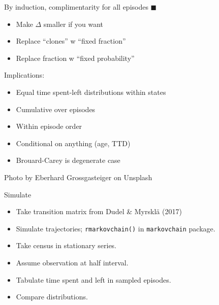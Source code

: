 \documentclass[20pt,usenames,dvipsnames]{beamer}
\newcommand*{\QEDA}{\hfill\ensuremath{\blacksquare}}
\begin{document}
\begin{frame}[plain]
\Large
\begin{center}
By induction, complimentarity for all episodes \QEDA
\end{center}
\pause
\begin{itemize}[<+->]
  \item Make $\Delta$ smaller if you want
  \item Replace ``clones'' w ``fixed fraction''
  \item Replace fraction w ``fixed probability''
\end{itemize}
\end{frame}

\begin{frame}[plain]
\Large
\begin{center}
Implications:
\pause
\begin{itemize}[<+->]
  \item Equal time spent-left distributions within states
  \item Cumulative over episodes
  \item Within episode order
  \item Conditional on anything (age, TTD)
  \item Brouard-Carey is degenerate case
\end{itemize}
\end{center}
\end{frame}

{
\begin{frame}[plain]
\tiny
\flushright
\vspace{18cm}
   Photo by Eberhard Grossgasteiger on Unsplash
\end{frame}
}
\begin{frame}[plain]
\Large
\begin{center}
Simulate
\begin{itemize}[<+->]
  \item Take transition matrix from \normalsize{Dudel \& Myrskl\"a (2017)}
  \item Simulate trajectories; \texttt{rmarkovchain()} in \texttt{markovchain}
  package.
  \item Take census in stationary series. 
  \item Assume observation at half interval.
  \item Tabulate time spent and left in sampled episodes.
  \item Compare distributions.
\end{itemize}
\end{center}
\end{frame}
\end{document}
